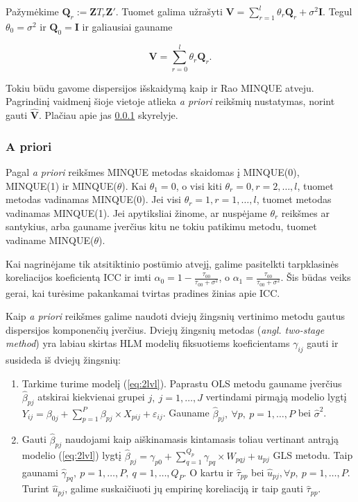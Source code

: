 \documentclass[12pt,a4paper]{article}
\begin{document}
Pažymėkime $\mathbf{Q}_r:= \mathbf{Z}T_r\mathbf{Z'}$. Tuomet galima užrašyti $\mathbf{V}=\sum^l_{r=1}\theta_r\mathbf{Q}_r+\sigma^2 \mathbf{I}$. Tegul $\theta_0 = \sigma^2$ ir $\mathbf{Q}_0=\mathbf{I}$ ir galiausiai gauname

\begin{equation}
\mathbf{V}=\sum^l_{r=0} \theta_r\mathbf{Q}_r.
\end{equation}

Tokiu būdu gavome dispersijos išskaidymą kaip ir Rao MINQUE atveju. Pagrindinį vaidmenį šioje vietoje atlieka \textit{a priori} reikšmių nustatymas, norint gauti $\mathbf{\hat{V}}$. Plačiau apie jas \ref{subsubsec:apriori} skyrelyje. 



\subsubsection{A priori}\label{subsubsec:apriori}
\indent Pagal \textit{a priori} reikšmes MINQUE metodas skaidomas į MINQUE(0), MINQUE(1) ir MINQUE($\theta$). Kai $\theta_1=0$, o visi kiti $\theta_r=0, r = 2,\dots,l$, tuomet metodas vadinamas MINQUE(0). Jei visi $\theta_r=1, r=1,\dots,l$, tuomet metodas vadinamas MINQUE(1). Jei apytiksliai žinome, ar nuspėjame $\theta_r$ reikšmes ar santykius, arba gauname įverčius kitu ne tokiu patikimu metodu, tuomet vadiname MINQUE($\theta$).

\indent Kai nagrinėjame tik atsitiktinio postūmio atvejį, galime pasitelkti tarpklasinės koreliacijos koeficientą ICC ir imti $\alpha_0=1-\frac{\tau_{00}}{\tau_{00}+\sigma^2}$, o $\alpha_1=\frac{\tau_{00}}{\tau_{00}+\sigma^2}$. Šis būdas veiks gerai, kai turėsime pakankamai tvirtas pradines žinias apie ICC\cite{delpish}.

\indent Kaip \textit{a priori} reikšmes galime naudoti dviejų žingsnių vertinimo metodu gautus dispersijos komponenčių įverčius. Dviejų žingsnių metodas (\textit{angl. two-stage method}) yra labiau skirtas HLM modelių fiksuotiems koeficientams $\gamma_{ij}$ gauti ir susideda iš dviejų žingsnių:
\begin{enumerate}
\item Tarkime turime modelį (\ref{eq:2lvl}). Paprastu OLS metodu gauname įverčius $\hat{\beta}_{pj}$ atskirai kiekvienai grupei $j,\ j=1,\dots,J$ vertindami pirmąją modelio lygtį $Y_{ij} = \beta_{0j}+\sum^P_{p = 1} \beta_{pj}\times X_{pij}+\varepsilon_{ij}$. Gauname $\hat{\beta}_{pj}, \ \forall p,\ p=1,\dots,P$ bei $\hat{\sigma}^2$.
\item Gauti $\hat{\beta}_{pj}$ naudojami kaip aiškinamasis kintamasis toliau vertinant antrąją modelio (\ref{eq:2lvl}) lygtį $\hat{\beta}_{pj} = \gamma_{p0} + \sum^{Q_p}_{q=1}\gamma_{pq}\times W_{pqj}+u_{pj}$ GLS metodu. Taip gaunami $\hat{\gamma}_{pq}, \ p=1,\dots,P,\  q=1,\dots,Q_P$. O kartu ir $\hat{\tau}_{pp}$ bei $\hat{u}_{pj}, \forall p,\ p=1,\dots,P$. Turint $\hat{u}_{pj}$, galime suskaičiuoti jų empirinę koreliaciją ir taip gauti $\hat{\tau}_{pp}$.
\end{enumerate}
\end{document}
